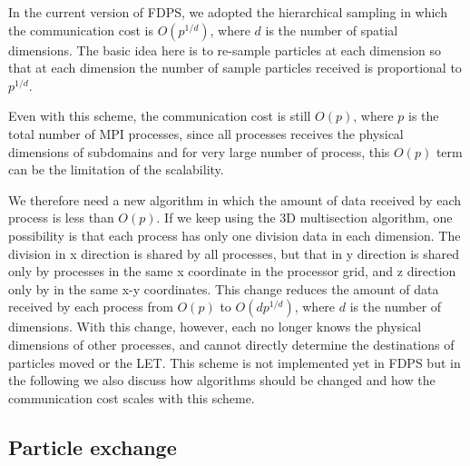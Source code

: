 In the current version of FDPS, we adopted the hierarchical sampling
\cite{Iwasawaetal2016,Iwasawaetal2019barxive} in which the communication cost
is  $O(p^{1/d})$, where $d$ is the number of
spatial dimensions. The basic idea here is to re-sample particles at
each dimension so that at each dimension the number of sample
particles received is proportional to $p^{1/d}$.

Even with this scheme, the communication cost is still $O(p)$, where
$p$ is the total number of MPI processes, since all processes receives
the physical dimensions of subdomains and for very large number of
process, this $O(p)$ term can be the limitation of the scalability.

We therefore need a new algorithm in which the amount of data received
by each process is less than $O(p)$. If we keep using the 3D
multisection algorithm, one possibility is that each process has only
one division data in each dimension. The division in x direction is
shared by all processes, but that in y direction is shared only by
processes in the same x coordinate in the processor grid, and z direction
only by in the same x-y coordinates. This change reduces  the amount of
data received by each process from $O(p)$ to $O(dp^{1/d})$, where $d$
is the number of dimensions. With this change, however, each no longer
knows the physical dimensions of other processes, and cannot directly
determine the destinations of particles moved or the LET.
This scheme is not implemented yet in
FDPS but in the following we also discuss how algorithms should be
changed and how the communication cost scales with this scheme.



\subsection{Particle exchange}

